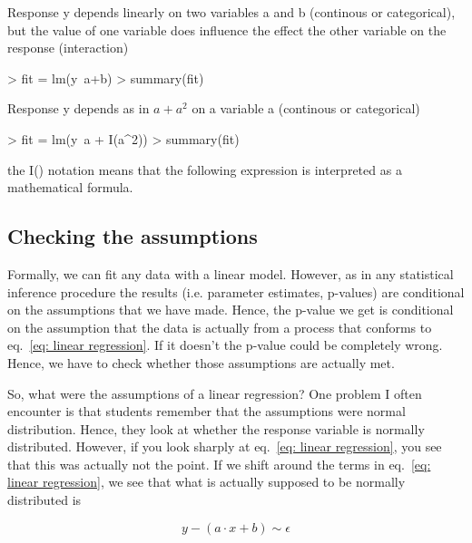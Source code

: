 \documentclass[a4paper,twoside]{tufte-book} %
\begin{document}
Response y depends linearly on two variables a and b (continous or categorical), but the value of one variable does influence the effect the other variable on the response (interaction)

\begin{Schunk}
\begin{Sinput}
> fit = lm(y~a+b)
> summary(fit)
\end{Sinput}
\end{Schunk}

Response y depends as in $a + a^2$ on a variable a (continous or categorical)

\begin{Schunk}
\begin{Sinput}
> fit = lm(y~a + I(a^2))
> summary(fit)
\end{Sinput}
\end{Schunk}

the I() notation means that the following expression is interpreted as a mathematical formula. 



\subsection{Checking the assumptions}

Formally, we can fit any data with a linear model. However, as in any statistical inference procedure the results (i.e. parameter estimates, p-values) are conditional on the assumptions that we have made. Hence, the p-value we get is conditional on the assumption that the data is actually from a process that conforms to eq.~\ref{eq: linear regression}. If it doesn't the p-value could be completely wrong. Hence, we have to check whether those assumptions are actually met. 

So, what were the assumptions of a linear regression? One problem I often encounter is that students remember that the assumptions were normal distribution. Hence, they look at whether the response variable is normally distributed. However, if you look sharply at eq.~\ref{eq: linear regression}, you see that this was actually not the point. If we shift around the terms in eq.~\ref{eq: linear regression}, we see that what is actually supposed to be normally distributed is 

\begin{equation} \label{eq: linear regression}
y - (a \cdot x + b ) \sim \epsilon 
\end{equation}
\end{document}
